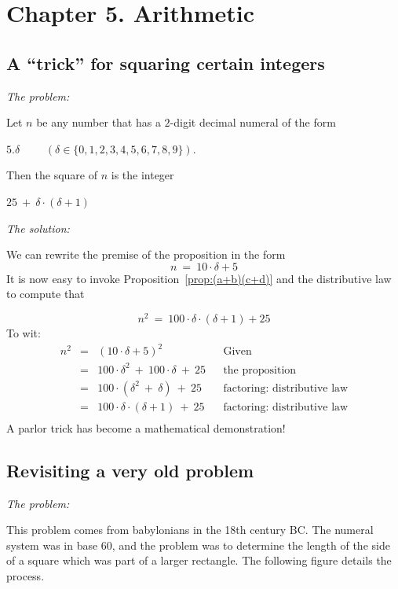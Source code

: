 
\section{Chapter 5. Arithmetic}


\subsection{A ``trick'' for squaring certain integers}


\noindent \textit{The problem:}

Let $n$ be any number that has a $2$-digit decimal numeral of the form

\hspace{.25in}$5.\delta$ \ \ \ \ $(\delta \in \{ 0,1,2,3,4,5,6,7,8,9\})$.

\noindent
Then the square of $n$ is the integer

\hspace{.25in}$25 \ + \ \delta \cdot (\delta +1)$
\medskip

\noindent \textit{The solution:}

We can rewrite the premise of the proposition in the form
\[ n \ = \ 10 \cdot \delta + 5 \]
It is now easy to invoke Proposition~\ref{prop:(a+b)(c+d)} and the
distributive law to compute that

\[ n^2 \ = \ 100 \cdot \delta \cdot (\delta+1) + 25 \]
To wit: 
\[
\begin{array}{lclll}
n^2 & = & (10 \cdot \delta + 5)^2 & & \mbox{Given} \\
    & = & 100 \cdot \delta^2 \ + \ 100 \cdot \delta \ + \ 25
              & & \mbox{the proposition} \\
    & = & 100 \cdot (\delta^2 \ + \ \delta) \ + \ 25
              & & \mbox{factoring: distributive law} \\
    & = & 100 \cdot \delta \cdot (\delta + 1) \ + \ 25
              & & \mbox{factoring: distributive law} \\
\end{array}
\]
A parlor trick has become a mathematical demonstration!


\subsection{Revisiting a very old problem}

\noindent \textit{The problem:}

This problem comes from babylonians in the 18th century BC.
The numeral system was in base 60, and the problem was to determine the length of the side of a square which was part of a larger rectangle.
The following figure details the process.
\medskip

